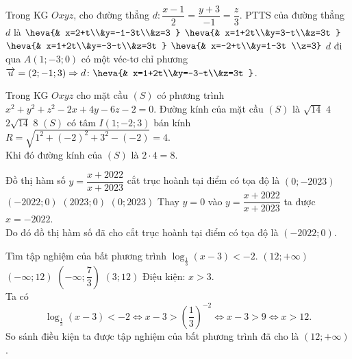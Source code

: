 \begin{ex}%
Trong KG $Oxyz$, cho đường thẳng $d\colon \dfrac{x-1}{2}=\dfrac{y+3}{-1}=\dfrac{z}{3}$. PTTS của đường thẳng $d$ là
\choice 
{$\heva{& x=2+t\\&y=-1-3t\\&z=3 }$} 
{$\heva{& x=1+2t\\&y=3-t\\&z=3t }$}
{\True $\heva{& x=1+2t\\&y=-3-t\\&z=3t }$} 
{$\heva{& x=-2+t\\&y=1-3t \\z=3}$}
\loigiai
{
$d$ đi qua $A(1;-3;0)$ có một véc-tơ chỉ phương $\overrightarrow{u}=(2;-1;3)\Rightarrow d\colon\heva{& x=1+2t\\&y=-3-t\\&z=3t }$.
}
\end{ex}

\begin{ex}%
Trong KG $Oxyz$ cho mặt cầu $(S)$ có phương trình $x^2+y^2+z^2-2x+4y-6z-2=0$. Đường kính của mặt cầu $(S)$ là
\choice 
{$\sqrt{14}$} 
{$4$}
{$2\sqrt{14}$} 
{\True $8$}
\loigiai
{
$(S)$ có tâm $I(1;-2;3)$ bán kính $R=\sqrt{1^2+(-2)^2+3^2-(-2)}=4$.\\
Khi đó đường kính của $(S)$ là $2\cdot 4=8$.
}
\end{ex}

\begin{ex}%
Đồ thị hàm số $y=\dfrac{x+2022}{x+2023}$ cắt trục hoành tại điểm có tọa độ là
\choice 
{$(0;-2023)$} 
{\True $(-2022;0)$}
{$(2023;0)$} 
{$(0;2023)$}
\loigiai
{
Thay $y=0$ vào $y=\dfrac{x+2022}{x+2023}$ ta được $x=-2022$.\\
Do đó đồ thị hàm số đã cho cắt trục hoành tại điểm có tọa độ là $(-2022;0)$.
}
\end{ex}

\begin{ex}%
Tìm tập nghiệm của bất phương trình $\log_{\tfrac{1}{3}}(x-3)<-2$.
\choice 
{\True $(12;+\infty )$} 
{$(-\infty ;12)$}
{$\left (-\infty ;\dfrac{7}{3} \right )$} 
{$(3;12)$}
\loigiai
{
Điệu kiện: $x>3$.\\
Ta có
$$\log_{\tfrac{1}{3}}(x-3)<-2\Leftrightarrow x-3>\left (\dfrac{1}{3} \right )^{-2}\Leftrightarrow x-3>9\Leftrightarrow x>12.$$
So sánh điều kiện ta được tập nghiệm của bất phương trình đã cho là $(12;+\infty )$.
}
\end{ex}

